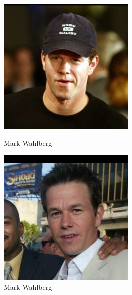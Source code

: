 \documentclass[12pt, a4paper]{article}
\begin{document}
\begin{figure}[H]
  \includegraphics[width=\linewidth]{images/Mark_Wahlberg_0001.jpg}
  \caption{Mark Wahlberg}
\endminipage\hfill
{}
  \includegraphics[width=\linewidth]{images/Mark_Wahlberg_0004.jpg}
  \caption{Mark Wahlberg}
\endminipage\hfill
\end{figure}
\end{document}
